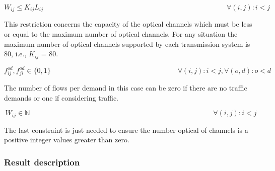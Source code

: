\begin{equation}
W_{ij} \leq K_{ij} L_{ij} \qquad  \qquad \qquad \qquad \qquad \qquad \qquad \qquad \qquad \qquad \qquad \qquad \qquad \forall(i,j) : i < j
\label{ILPOpaque5_Surv}
\end{equation}

This restriction concerns the capacity of the optical channels which must be less or equal to the maximum number of optical channels. For any situation the maximum number of optical channels supported by each transmission system is 80, i.e., $K_{ij}$ = 80.

\begin{equation}
f_{ij}^{od} , f_{ji}^{od} \in \{0,1\}   \qquad \qquad \qquad \qquad \qquad \qquad \qquad \qquad \qquad
\forall(i,j) : i < j, \forall(o,d) : o < d
\label{ILPOpaque6_Surv}
\end{equation}

The number of flows per demand in this case can be zero if there are no traffic demands or one if considering traffic.

\begin{equation}
W_{ij} \in \mathbb{N}  \qquad \qquad \qquad \qquad \qquad \qquad \qquad \qquad \qquad \qquad \qquad \qquad \qquad
\forall(i,j) : i < j
\label{ILPOpaque7_Surv}
\end{equation}

The last constraint is just needed to ensure the number optical of channels is a positive integer values greater than zero.\\

 
\subsubsection{Result description}

